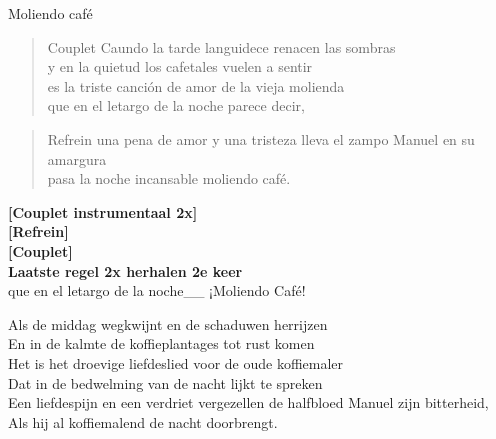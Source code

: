 \begin{song}[tropical]{Moliendo café}
\begin{verse}{Couplet}
Caundo la tarde languidece renacen las sombras\hspace{1.5em}\\
y en la quietud los cafetales vuelen a sentir\\
es la triste canción de amor de la vieja molienda\\
que en el letargo de la noche parece decir,\hspace{1em}\chord{$\downarrow\downarrow$}\hspace{1.5em}\chord{$\downarrow\downarrow$}
\end{verse}
\vspace{-1em}

\begin{verse}{Refrein}
una pena de amor y una tristeza lleva el zampo Manuel en su amargura\\
pasa la noche incansable moliendo café.\hspace{1em}\chord{$\downarrow\downarrow$}\hspace{1.5em}\chord{$\downarrow\downarrow$}
\end{verse}

\textbf{[Couplet instrumentaal 2x]}\\
\textbf{[Refrein]}\\
\textbf{[Couplet]}\\
\textbf{Laatste regel 2x herhalen 2e keer}\\
que en el letargo de la noche\_\_ ¡Moliendo Café!

\begin{translation}Als de middag wegkwijnt en de schaduwen herrijzen\\
En in de kalmte de koffieplantages tot rust komen\\
Het is het droevige liefdeslied voor de oude koffiemaler\\
Dat in de bedwelming van de nacht lijkt te spreken\\
\vspace{1em}
Een liefdespijn en een verdriet vergezellen de halfbloed Manuel zijn bitterheid,\\
Als hij al koffiemalend de nacht doorbrengt.\\
\end{translation}
\end{song}
